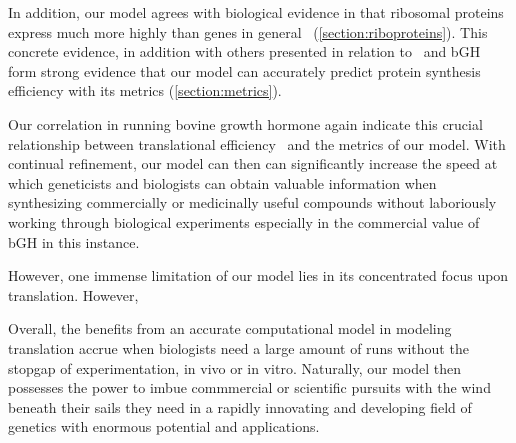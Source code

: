 \documentclass[12pt, draft]{article}
\numberwithin{equation}{section}
\begin{document}
In addition, our model agrees with biological evidence in that
ribosomal proteins express much more highly than genes in
general~\cite{rpoS:process} (\autoref{section:riboproteins}). This
concrete evidence, in addition with others presented in relation to
\prfB\ and bGH form strong evidence that our model can accurately
predict protein synthesis efficiency with its metrics (\autoref{section:metrics}).

Our correlation in running bovine growth hormone again indicate this
crucial relationship between translational
efficiency~\cite{schoner:bgh} and the metrics of our model. With
continual refinement, our model can then can significantly increase
the speed at which geneticists and biologists can obtain valuable
information when synthesizing commercially or medicinally useful
compounds without laboriously working through biological experiments
especially in the commercial value of bGH in this instance.

However, one immense limitation of our model lies in its concentrated
focus upon translation. However, 

Overall, the benefits from an accurate computational model in
modeling translation accrue when biologists need a large amount of
runs without the stopgap of experimentation, in vivo or in
vitro. Naturally, our model then possesses the power to imbue
commmercial or scientific pursuits with the wind beneath their sails
they need in a rapidly innovating and developing field of genetics
with enormous potential and applications.

{}
\begin{singlespace}  \end{singlespace}
\end{document}
